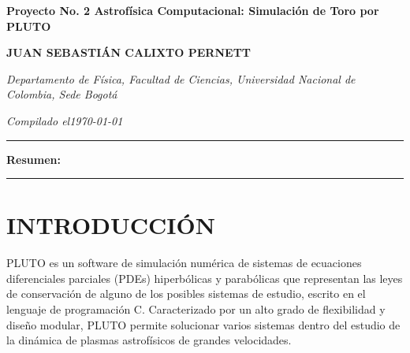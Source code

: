 \documentclass[11pt, letterpaper]{article}
\begin{document}

\begin{center}
    {\raggedright\sffamily\bfseries \fontsize{21}{23}\selectfont Proyecto No. 2 Astrofísica Computacional: Simulación de Toro por PLUTO\par}
    \vspace{1em}
    {\raggedright\sffamily\bfseries \fontsize{11}{13}\selectfont JUAN SEBASTIÁN CALIXTO PERNETT\par}
    \vspace{0.5em}
    {\raggedright\sffamily\itshape \fontsize{8}{10}\selectfont Departamento de Física, Facultad de Ciencias, Universidad Nacional de Colombia, Sede Bogotá\/\par}
    {\raggedright\sffamily \fontsize{8}{10}\selectfont {jcalixtop@unal.edu.co}\par}
    \vspace{0.5em}
    {\raggedright\sffamily\itshape \fontsize{8}{10}\selectfont Compilado el\/\today\par}
    \vspace{0.6em}
    \hrule
    \vspace{0.3em}
\end{center}


\noindent
{\small\bfseries \textbf{Resumen}:  \par}


\vspace{0.3em}
\noindent\rule{\linewidth}{0.4pt}
\vspace{0.6em}


\section{INTRODUCCIÓN}

PLUTO es un software de simulación numérica de sistemas de ecuaciones diferenciales parciales (PDEs) hiperbólicas y parabólicas que representan las leyes de conservación de alguno de los posibles sistemas de estudio, escrito en el lenguaje de programación C. Caracterizado por un alto grado de flexibilidad y diseño modular, PLUTO permite solucionar varios sistemas dentro del estudio de la dinámica de plasmas astrofísicos de grandes velocidades.
\end{document}
